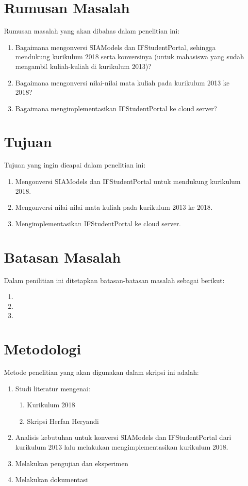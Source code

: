 
\section{Rumusan Masalah}
\label{sec:rumusan}
Rumusan masalah yang akan dibahas dalam penelitian ini:
\begin{enumerate}
	\item Bagaimana mengonversi SIAModels dan IFStudentPortal, sehingga mendukung kurikulum 2018 serta konversinya (untuk mahasiswa yang sudah mengambil kuliah-kuliah di kurikulum 2013)?
	\item Bagaimana mengonversi nilai-nilai mata kuliah pada kurikulum 2013 ke 2018?
	\item Bagaimana mengimplementasikan IFStudentPortal ke cloud server?
\end{enumerate}

\section{Tujuan}
\label{sec:tujuan}
Tujuan yang ingin dicapai dalam penelitian ini:
\begin{enumerate}
	\item Mengonversi SIAModels dan IFStudentPortal untuk mendukung kurikulum 2018.
	\item Mengonversi nilai-nilai mata kuliah pada kurikulum 2013 ke 2018.
	\item Mengimplementasikan IFStudentPortal ke cloud server.
\end{enumerate}

\section{Batasan Masalah}
\label{sec:batasan}
Dalam penilitian ini ditetapkan batasan-batasan masalah sebagai berikut:
\begin{enumerate}
	\item 
	\item 
	\item
\end{enumerate}

\section{Metodologi}
\label{sec:metlit}
Metode penelitian yang akan digunakan dalam skripsi ini adalah:
\begin{enumerate}
	\item Studi literatur mengenai:
	\begin{enumerate}
		\item Kurikulum 2018
		\item Skripsi Herfan Heryandi
	\end{enumerate}
	\item Analisis kebutuhan untuk konversi SIAModels dan IFStudentPortal dari kurikulum 2013 lalu melakukan mengimplementasikan kurikulum 2018.
	\item Melakukan pengujian dan eksperimen
	\item Melakukan dokumentasi
	
\end{enumerate}

